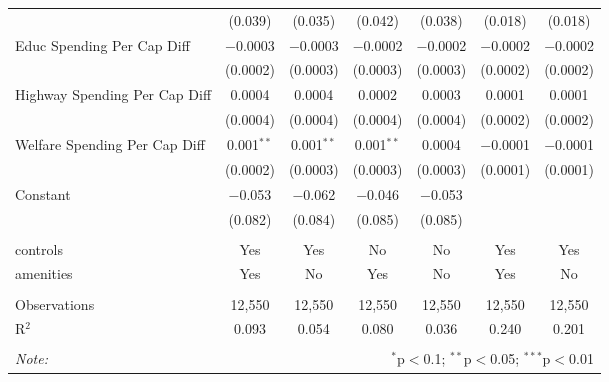 \begin{table}[!htbp]
\begin{tabular}{@{\extracolsep{5pt}}lcccccc}
  & (0.039) & (0.035) & (0.042) & (0.038) & (0.018) & (0.018) \\ 
  Educ Spending Per Cap Diff & $-$0.0003 & $-$0.0003 & $-$0.0002 & $-$0.0002 & $-$0.0002 & $-$0.0002 \\ 
  & (0.0002) & (0.0003) & (0.0003) & (0.0003) & (0.0002) & (0.0002) \\ 
  Highway Spending Per Cap Diff & 0.0004 & 0.0004 & 0.0002 & 0.0003 & 0.0001 & 0.0001 \\ 
  & (0.0004) & (0.0004) & (0.0004) & (0.0004) & (0.0002) & (0.0002) \\ 
  Welfare Spending Per Cap Diff & 0.001$^{**}$ & 0.001$^{**}$ & 0.001$^{**}$ & 0.0004 & $-$0.0001 & $-$0.0001 \\ 
  & (0.0002) & (0.0003) & (0.0003) & (0.0003) & (0.0001) & (0.0001) \\ 
  Constant & $-$0.053 & $-$0.062 & $-$0.046 & $-$0.053 &  &  \\ 
  & (0.082) & (0.084) & (0.085) & (0.085) &  &  \\ 
 \hline \\[-1.8ex] 
controls & Yes & Yes & No & No & Yes & Yes \\ 
amenities & Yes & No & Yes & No & Yes & No \\ 
\hline \\[-1.8ex] 
Observations & 12,550 & 12,550 & 12,550 & 12,550 & 12,550 & 12,550 \\ 
R$^{2}$ & 0.093 & 0.054 & 0.080 & 0.036 & 0.240 & 0.201 \\ 
\hline 
\hline \\[-1.8ex] 
\textit{Note:}  & \multicolumn{6}{r}{$^{*}$p$<$0.1; $^{**}$p$<$0.05; $^{***}$p$<$0.01} \\ 
\end{tabular} 
\end{table} 
